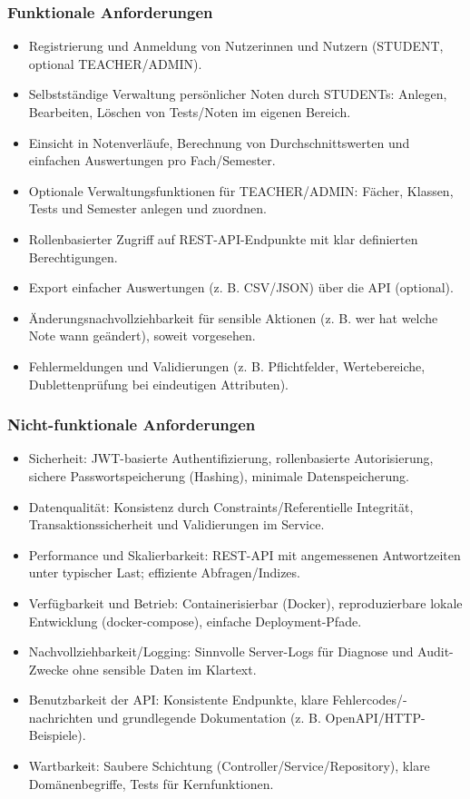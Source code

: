 \documentclass[12pt,a4paper]{article}
\begin{document}
    \subsubsection{Funktionale Anforderungen}
    \begin{itemize}
        \item Registrierung und Anmeldung von Nutzerinnen und Nutzern (STUDENT, optional TEACHER/ADMIN).
        \item Selbstständige Verwaltung persönlicher Noten durch STUDENTs: Anlegen, Bearbeiten, Löschen von Tests/Noten im eigenen Bereich.
        \item Einsicht in Notenverläufe, Berechnung von Durchschnittswerten und einfachen Auswertungen pro Fach/Semester.
        \item Optionale Verwaltungsfunktionen für TEACHER/ADMIN: Fächer, Klassen, Tests und Semester anlegen und zuordnen.
        \item Rollenbasierter Zugriff auf REST-API-Endpunkte mit klar definierten Berechtigungen.
        \item Export einfacher Auswertungen (z. B. CSV/JSON) über die API (optional).
        \item Änderungsnachvollziehbarkeit für sensible Aktionen (z. B. wer hat welche Note wann geändert), soweit vorgesehen.
        \item Fehlermeldungen und Validierungen (z. B. Pflichtfelder, Wertebereiche, Dublettenprüfung bei eindeutigen Attributen).
    \end{itemize}

    \subsubsection{Nicht-funktionale Anforderungen}
    \begin{itemize}
        \item Sicherheit: JWT-basierte Authentifizierung, rollenbasierte Autorisierung, sichere Passwortspeicherung (Hashing), minimale Datenspeicherung.
        \item Datenqualität: Konsistenz durch Constraints/Referentielle Integrität, Transaktionssicherheit und Validierungen im Service.
        \item Performance und Skalierbarkeit: REST-API mit angemessenen Antwortzeiten unter typischer Last; effiziente Abfragen/Indizes.
        \item Verfügbarkeit und Betrieb: Containerisierbar (Docker), reproduzierbare lokale Entwicklung (docker-compose), einfache Deployment-Pfade.
        \item Nachvollziehbarkeit/Logging: Sinnvolle Server-Logs für Diagnose und Audit-Zwecke ohne sensible Daten im Klartext.
        \item Benutzbarkeit der API: Konsistente Endpunkte, klare Fehlercodes/-nachrichten und grundlegende Dokumentation (z. B. OpenAPI/HTTP-Beispiele).
        \item Wartbarkeit: Saubere Schichtung (Controller/Service/Repository), klare Domänenbegriffe, Tests für Kernfunktionen.
    \end{itemize}
\end{document}
